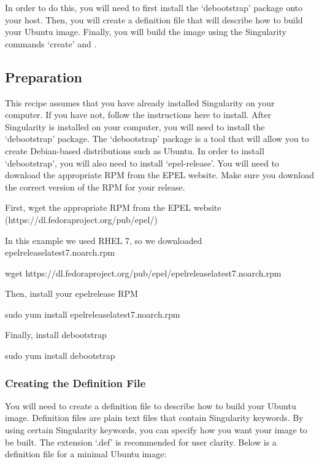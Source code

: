 \documentclass[letterpaper,10pt,english]{sphinxmanual}
\begin{document}
In order to do this, you will need to first install the ‘debootstrap’ package onto your host. Then, you will create
a definition file that will describe how to build your Ubuntu image. Finally, you will build the image using the Singularity
commands ‘create’ and .


\subsection{Preparation}
\label{\detokenize{appendix:preparation}}
This recipe assumes that you have already installed Singularity on your computer. If you have not, follow the instructions here
to install. After Singularity is installed on your computer, you will need to install the ‘debootstrap’ package. The ‘debootstrap’
package is a tool that will allow you to create Debian-based distributions such as Ubuntu. In order to install ‘debootstrap’, you will
also need to install ‘epel-release’. You will need to download the appropriate RPM from the EPEL website. Make sure you download the correct
version of the RPM for your release.

%
\begin{sphinxVerbatim}[commandchars=\\\{\}]
\PYGZsh{} First, wget the appropriate RPM from the EPEL website (https://dl.fedoraproject.org/pub/epel/)

\PYGZsh{} In this example we used RHEL 7, so we downloaded epel\PYGZhy{}release\PYGZhy{}latest\PYGZhy{}7.noarch.rpm

\PYGZdl{} wget https://dl.fedoraproject.org/pub/epel/epel\PYGZhy{}release\PYGZhy{}latest\PYGZhy{}7.noarch.rpm


\PYGZsh{} Then, install your epel\PYGZhy{}release RPM

\PYGZdl{} sudo yum install epel\PYGZhy{}release\PYGZhy{}latest\PYGZhy{}7.noarch.rpm


\PYGZsh{} Finally, install debootstrap

\PYGZdl{} sudo yum install debootstrap
\end{sphinxVerbatim}


\subsubsection{Creating the Definition File}
\label{\detokenize{appendix:creating-the-definition-file}}
You will need to create a definition file to describe how to build your Ubuntu image. Definition files are plain text files that contain Singularity
keywords. By using certain Singularity keywords, you can specify how you want your image to be built. The extension ‘.def’ is recommended for user clarity.
Below is a definition file for a minimal Ubuntu image:
\end{document}

